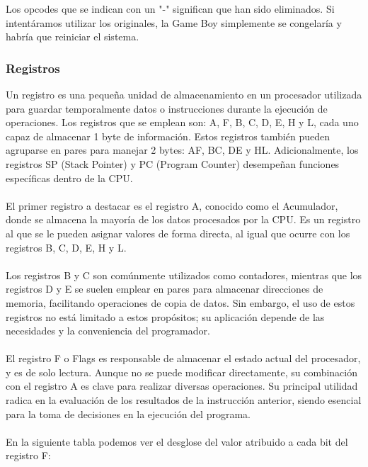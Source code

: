 Los opcodes que se indican con un "-" significan que han sido eliminados. Si intentáramos utilizar los originales, la Game Boy simplemente se congelaría y habría que reiniciar el sistema.

\subsubsection{Registros}

Un registro es una pequeña unidad de almacenamiento en un procesador utilizada para guardar temporalmente datos o instrucciones durante la ejecución de operaciones. Los registros que se emplean son: A, F, B, C, D, E, H y L, cada uno capaz de almacenar 1 byte de información. Estos registros también pueden agruparse en pares para manejar 2 bytes: AF, BC, DE y HL. Adicionalmente, los registros SP (Stack Pointer) y PC (Program Counter) desempeñan funciones específicas dentro de la CPU.
\\\\
El primer registro a destacar es el registro A, conocido como el Acumulador, donde se almacena la mayoría de los datos procesados por la CPU. Es un registro al que se le pueden asignar valores de forma directa, al igual que ocurre con los registros B, C, D, E, H y L.
\\\\
Los registros B y C son comúnmente utilizados como contadores, mientras que los registros D y E se suelen emplear en pares para almacenar direcciones de memoria, facilitando operaciones de copia de datos. Sin embargo, el uso de estos registros no está limitado a estos propósitos; su aplicación depende de las necesidades y la conveniencia del programador.
\\\\
El registro F o Flags es responsable de almacenar el estado actual del procesador, y es de solo lectura. Aunque no se puede modificar directamente, su combinación con el registro A es clave para realizar diversas operaciones. Su principal utilidad radica en la evaluación de los resultados de la instrucción anterior, siendo esencial para la toma de decisiones en la ejecución del programa.
\\\\
En la siguiente tabla podemos ver el desglose del valor atribuido a cada bit del registro F:

